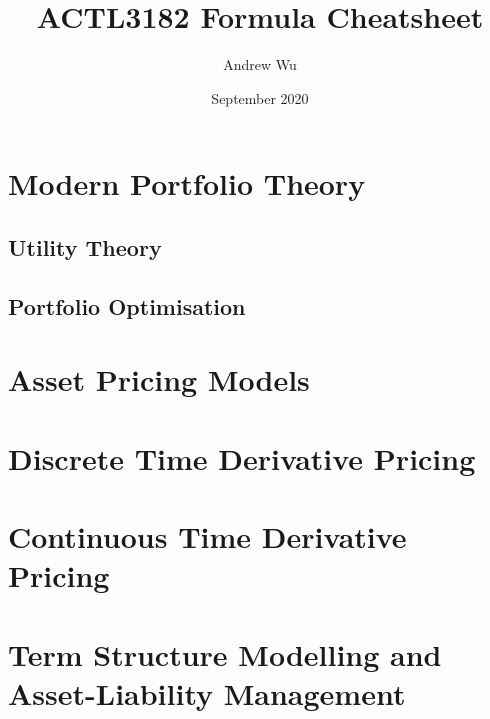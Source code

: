 \documentclass[11pt]{article}
\title{\textbf{ACTL3182 Formula Cheatsheet}}
\author{Andrew Wu}
\date{September 2020}
\begin{document}
	\maketitle
	\section{Modern Portfolio Theory}
	\subsection{Utility Theory}
	
	\subsection{Portfolio Optimisation}
	\section{Asset Pricing Models}
	\section{Discrete Time Derivative Pricing}
	\section{Continuous Time Derivative Pricing}
	\section{Term Structure Modelling and Asset-Liability Management}
	
\end{document}
